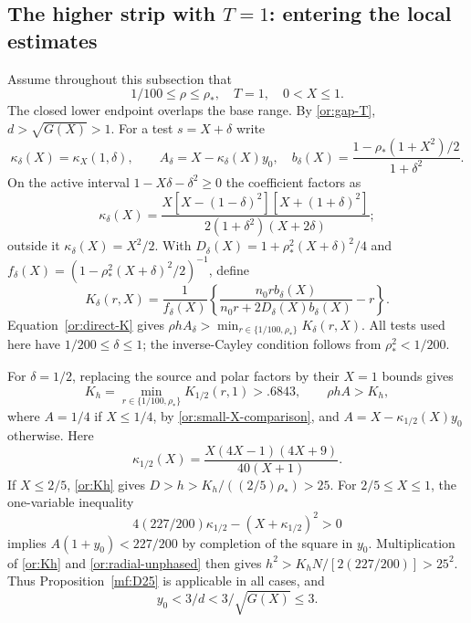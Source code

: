\documentclass[11pt,reqno]{amsart}
\numberwithin{equation}{section}
\theoremstyle{definition}
\theoremstyle{remark}
\begin{document}
\subsection{The higher strip with $T=1$: entering the local estimates}

Assume throughout this subsection that
\begin{equation}\label{or:T-domain}
           1/100\le\rho\le\rho_*,\quad T=1,\quad 0<X\le1.
\end{equation}
The closed lower endpoint overlaps the base range.  By
\eqref{or:gap-T}, $d>\sqrt{G(X)}>1$.
For a test $s=X+\delta$ write
\[
 \kappa_\delta(X)=\kappa_X(1,\delta),\qquad
 A_\delta=X-\kappa_\delta(X)y_0,
 \quad b_\delta(X)=\frac{1-\rho_*(1+X^2)/2}{1+\delta^2}.
\]
On the active interval $1-X\delta-\delta^2\ge0$ the coefficient factors as
\begin{equation}\label{or:T-kappa-factor}
 \kappa_\delta(X)=
 \frac{X[X-(1-\delta)^2][X+(1+\delta)^2]}
                 {2(1+\delta^2)(X+2\delta)};
\end{equation}
outside it $\kappa_\delta(X)=X^2/2$.  With
$D_\delta(X)=1+\rho_*^2(X+\delta)^2/4$ and
$f_\delta(X)=(1-\rho_*^2(X+\delta)^2/2)^{-1}$, define
\begin{equation}\label{or:T-source-function}
 K_\delta(r,X)=\frac1{f_\delta(X)}
 \left\{\frac{n_0r b_\delta(X)}{n_0r+2D_\delta(X)b_\delta(X)}-r\right\}.
\end{equation}
Equation~\eqref{or:direct-K} gives
$\rho hA_\delta>\min_{r\in\{1/100,\rho_*\}}K_\delta(r,X)$.
All tests used here have $1/200\le\delta\le1$; the inverse-Cayley
condition follows from $\rho_*^2<1/200$.

For $\delta=1/2$, replacing the source and polar factors by their
$X=1$ bounds gives
\begin{equation}\label{or:Kh}
 K_h=\min_{r\in\{1/100,\rho_*\}}K_{1/2}(r,1)>.6843,
 \qquad \rho h A>K_h,
\end{equation}
where $A=1/4$ if $X\le1/4$, by
\eqref{or:small-X-comparison}, and
$A=X-\kappa_{1/2}(X)y_0$ otherwise.  Here
\[
              \kappa_{1/2}(X)=\frac{X(4X-1)(4X+9)}{40(X+1)}.
\]
If $X\le2/5$, \eqref{or:Kh} gives
$D>h>K_h/((2/5)\rho_*)>25$.
For $2/5\le X\le1$, the one-variable inequality
\begin{equation}\label{or:T-first-square}
            4(227/200)\kappa_{1/2}-(X+\kappa_{1/2})^2>0
\end{equation}
implies $A(1+y_0)<227/200$ by completion of the square in $y_0$.
Multiplication of \eqref{or:Kh} and
\eqref{or:radial-unphased} then gives
$h^2>K_hN/[2(227/200)]>25^2$.
Thus Proposition~\ref{mf:D25} is applicable in all cases, and
\begin{equation}\label{or:T-ratio3}
                  y_0<3/d<3/\sqrt{G(X)}\le3.
\end{equation}
\end{document}
